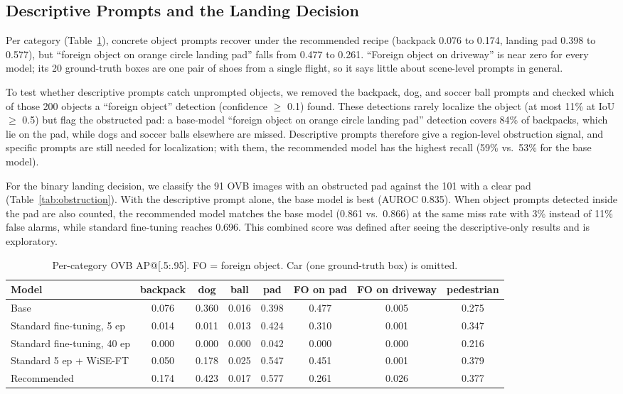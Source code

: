 \documentclass[conf]{new-aiaa}
\begin{document}
\subsection{Descriptive Prompts and the Landing Decision}

Per category (Table~\ref{tab:perclassovb}), concrete object prompts recover under the
recommended recipe (backpack 0.076 to 0.174, landing pad 0.398 to 0.577), but ``foreign object
on orange circle landing pad'' falls from 0.477 to 0.261. ``Foreign object on driveway'' is near
zero for every model; its 20 ground-truth boxes are one pair of shoes from a single flight, so
it says little about scene-level prompts in general.

To test whether descriptive prompts catch unprompted objects, we removed the backpack, dog, and
soccer ball prompts and checked which of those 200 objects a ``foreign object'' detection
(confidence $\geq$ 0.1) found. These detections rarely localize the object (at most 11\% at IoU
$\geq$ 0.5) but flag the obstructed pad: a base-model ``foreign object on orange circle landing
pad'' detection covers 84\% of backpacks, which lie on the pad, while dogs and soccer balls
elsewhere are missed. Descriptive prompts therefore give a region-level obstruction signal, and
specific prompts are still needed for localization; with them, the recommended model has the
highest recall (59\% vs.\ 53\% for the base model).

For the binary landing decision, we classify the 91 OVB images with an obstructed pad against
the 101 with a clear pad (Table~\ref{tab:obstruction}). With the descriptive prompt alone, the
base model is best (AUROC 0.835). When object prompts detected inside the pad are also
counted, the recommended model matches the base model (0.861 vs.\ 0.866) at the same miss rate
with 3\% instead of 11\% false alarms, while standard fine-tuning reaches 0.696. This combined
score was defined after seeing the descriptive-only results and is exploratory.

\begin{table}[hbt!]
\caption{Per-category OVB AP@[.5:.95]. FO = foreign object. Car (one ground-truth box) is omitted.}
\label{tab:perclassovb}
\centering
\begin{tabular}{lccccccc}
\hline
\textbf{Model} & \textbf{backpack} & \textbf{dog} & \textbf{ball} & \textbf{pad} & \textbf{FO on pad} & \textbf{FO on driveway} & \textbf{pedestrian} \\
\hline
Base             & 0.076 & 0.360 & 0.016 & 0.398 & 0.477 & 0.005 & 0.275 \\
Standard fine-tuning, 5 ep  & 0.014 & 0.011 & 0.013 & 0.424 & 0.310 & 0.001 & 0.347 \\
Standard fine-tuning, 40 ep & 0.000 & 0.000 & 0.000 & 0.042 & 0.000 & 0.000 & 0.216 \\
Standard 5 ep + WiSE-FT     & 0.050 & 0.178 & 0.025 & 0.547 & 0.451 & 0.001 & 0.379 \\
Recommended      & 0.174 & 0.423 & 0.017 & 0.577 & 0.261 & 0.026 & 0.377 \\
\hline
\end{tabular}
\end{table}
\end{document}
